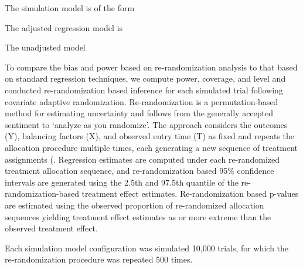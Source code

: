 The simulation model is of the form

The adjusted regression model is

The unadjusted model


To compare the bias and power based on re-randomization analysis to that based on standard regression techniques, we compute power, coverage, and level and conducted re-randomization based inference for each simulated trial following covariate adaptive randomization.  Re-randomization is a permutation-based method for estimating uncertainty and follows from the generally accepted sentiment to ‘analyze as you randomize’.  The approach considers the outcomes (Y), balancing factors (X), and observed entry time (T) as fixed and repeats the allocation procedure multiple times, each generating a new sequence of treatment assignments (.  Regression estimates are computed under each re-randomized treatment allocation sequence, and re-randomization based 95\% confidence intervals are generated using the 2.5th and 97.5th quantile of the re-randomization-based treatment effect estimates.  Re-randomization based p-values are estimated using the observed proportion of re-randomized allocation sequences yielding treatment effect estimates as or more extreme than the observed treatment effect.  

Each simulation model configuration was simulated 10,000 trials, for which the re-randomization procedure was repeated 500 times.

